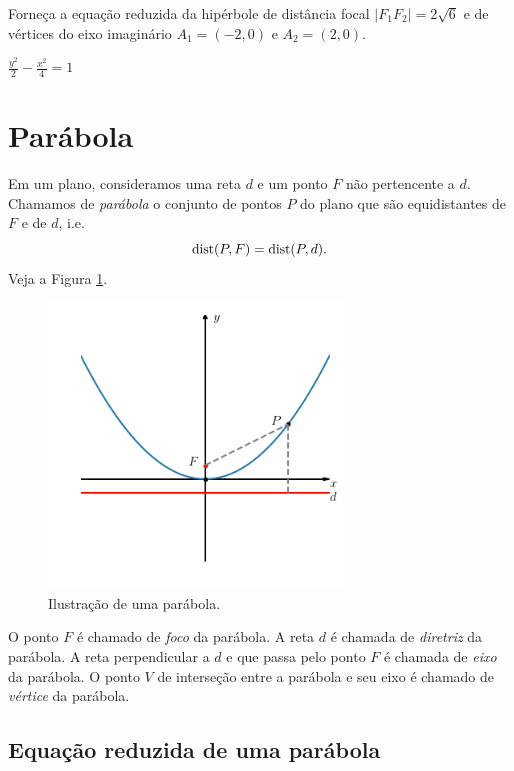 \begin{exer}
  Forneça a equação reduzida da hipérbole de distância focal $|F_1F_2|=2\sqrt{6}$ e de vértices do eixo imaginário $A_1=(-2, 0)$ e $A_2=(2, 0)$.
\end{exer}
\begin{resp}
  $\displaystyle \frac{y^2}{2} - \frac{x^2}{4} = 1$
\end{resp}

\section{Parábola}\label{cap_conicas_sec_parabola}

Em um plano, consideramos uma reta $d$ e um ponto $F$ não pertencente a $d$. Chamamos de \emph{parábola} o conjunto de pontos $P$ do plano que são equidistantes de $F$ e de $d$, i.e.
\begin{equation}
  \operatorname{dist}(P,F) = \operatorname{dist}(P,d).
\end{equation}
Veja a Figura \ref{fig:parabola}.

\begin{figure}[H]
  \centering
  \includegraphics[width=0.7\textwidth]{./cap_conicas/dados/fig_parabola/fig_parabola}
  \caption{Ilustração de uma parábola.}
  \label{fig:parabola}
\end{figure}

O ponto $F$ é chamado de \emph{foco} da parábola. A reta $d$ é chamada de \emph{diretriz} da parábola. A reta perpendicular a $d$ e que passa pelo ponto $F$ é chamada de \emph{eixo} da parábola. O ponto $V$ de interseção entre a parábola e seu eixo é chamado de \emph{vértice} da parábola.

\subsection{Equação reduzida de uma parábola}

